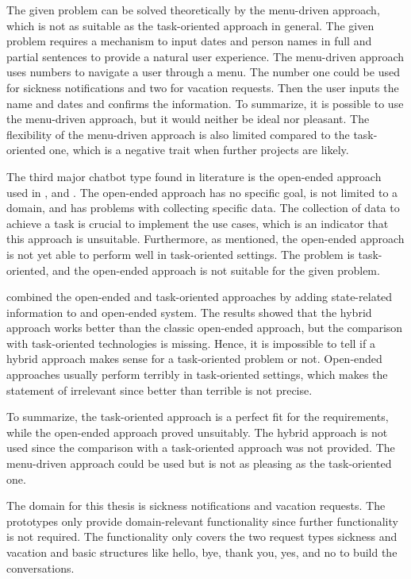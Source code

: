 The given problem can be solved theoretically by the menu-driven approach, which is not as suitable as the task-oriented approach in general.
The given problem requires a mechanism to input dates and person names in full and partial sentences to provide a natural user experience.
The menu-driven approach uses numbers to navigate a user through a menu.
The number one could be used for sickness notifications and two for vacation requests. 
Then the user inputs the name and dates and confirms the information.
To summarize, it is possible to use the menu-driven approach, but it would neither be ideal nor pleasant.
The flexibility of the menu-driven approach is also limited compared to the task-oriented one, which is a negative trait when further projects are likely.

The third major chatbot type found in literature is the open-ended approach used in \citet{williams2017hybrid, bordes2016learning}, and \citet{rahman2017programming}.
The open-ended approach has no specific goal, is not limited to a domain, and has problems with collecting specific data.
The collection of data to achieve a task is crucial to implement the use cases, which is an indicator that this approach is unsuitable.
Furthermore, as \citet{bordes2016learning} mentioned, the open-ended approach is not yet able to perform well in task-oriented settings.
The problem is task-oriented, and the open-ended approach is not suitable for the given problem.

\citet{williams2017hybrid} combined the open-ended and task-oriented approaches by adding state-related information to and open-ended system.
The results showed that the hybrid approach works better than the classic open-ended approach, but the comparison with task-oriented technologies is missing.
Hence, it is impossible to tell if a hybrid approach makes sense for a task-oriented problem or not.
Open-ended approaches usually perform terribly in task-oriented settings, which makes the statement of \citet{williams2017hybrid} irrelevant since better than terrible is not precise.

To summarize, the task-oriented approach is a perfect fit for the requirements, while the open-ended approach proved unsuitably.
The hybrid approach is not used since the comparison with a task-oriented approach was not provided.
The menu-driven approach could be used but is not as pleasing as the task-oriented one.

The domain for this thesis is sickness notifications and vacation requests.
The prototypes only provide domain-relevant functionality since further functionality is not required.
The functionality only covers the two request types sickness and vacation and basic structures like hello, bye, thank you, yes, and no to build the conversations.

